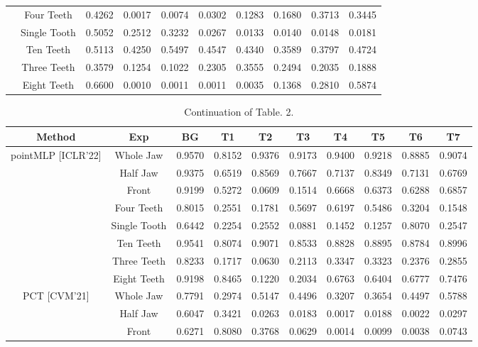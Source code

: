 \documentclass[letterpaper, 10 pt, conference]{ieeeconf}  %
\begin{document}
\begin{table*}[htbp]
\begin{tabular}{|c|c|c|c|c |c |c |c |c |c|}
& Four Teeth &  0.4262 & 0.0017 & 0.0074 & 0.0302 & 0.1283 & 0.1680 & 0.3713 & 0.3445\\
& Single Tooth & 0.5052 & 0.2512 & 0.3232 & 0.0267 & 0.0133 & 0.0140 & 0.0148 & 0.0181 \\
& Ten Teeth & 0.5113& 0.4250& 0.5497& 0.4547& 0.4340& 0.3589& 0.3797& 0.4724\\
& Three Teeth & 0.3579& 0.1254& 0.1022& 0.2305& 0.3555& 0.2494& 0.2035& 0.1888\\
& Eight Teeth & 0.6600& 0.0010& 0.0011& 0.0011& 0.0035& 0.1368& 0.2810& 0.5874\\
\hline
\end{tabular}
\label{tab:toothres}
\end{table*}

\begin{table*}[htbp]
\centering
\caption {Continuation of Table. 2. }%
\scriptsize
\begin{tabular}{|c|c|c|c|c |c |c |c |c |c|}
\hline
Method  & Exp & BG & T1 & T2 & T3 &  T4 & T5 & T6 & T7  \\ \hline
{pointMLP [ICLR'22]}  & Whole Jaw &  0.9570 & 0.8152 & 0.9376 & 0.9173 & 0.9400 & 0.9218 & 0.8885 & 0.9074\\
& Half Jaw & 0.9375 & 0.6519 & 0.8569 & 0.7667 & 0.7137 & 0.8349 & 0.7131 & 0.6769\\
& Front & 0.9199 & 0.5272 & 0.0609 & 0.1514 & 0.6668 & 0.6373 & 0.6288 & 0.6857\\
& Four Teeth & 0.8015 & 0.2551 & 0.1781 & 0.5697 & 0.6197 & 0.5486 & 0.3204 & 0.1548\\
& Single Tooth & 0.6442 & 0.2254 & 0.2552 & 0.0881 & 0.1452 & 0.1257 & 0.8070 & 0.2547\\
& Ten Teeth & 0.9541& 0.8074& 0.9071& 0.8533& 0.8828& 0.8895& 0.8784& 0.8996\\
& Three Teeth & 0.8233& 0.1717& 0.0630& 0.2113& 0.3347& 0.3323& 0.2376& 0.2855\\
& Eight Teeth & 0.9198& 0.8465& 0.1220& 0.2034& 0.6763& 0.6404& 0.6777& 0.7476\\
\hline
{PCT [CVM'21]}  & Whole Jaw  & 0.7791 & 0.2974 & 0.5147 & 0.4496 & 0.3207 & 0.3654 & 0.4497 & 0.5788 \\
& Half Jaw & 0.6047 & 0.3421 & 0.0263 & 0.0183 & 0.0017 & 0.0188 & 0.0022 & 0.0297\\
& Front & 0.6271 & 0.8080 & 0.3768 & 0.0629 & 0.0014 & 0.0099 & 0.0038 & 0.0743\\

\end{tabular}
\end{table*}
\end{document}
